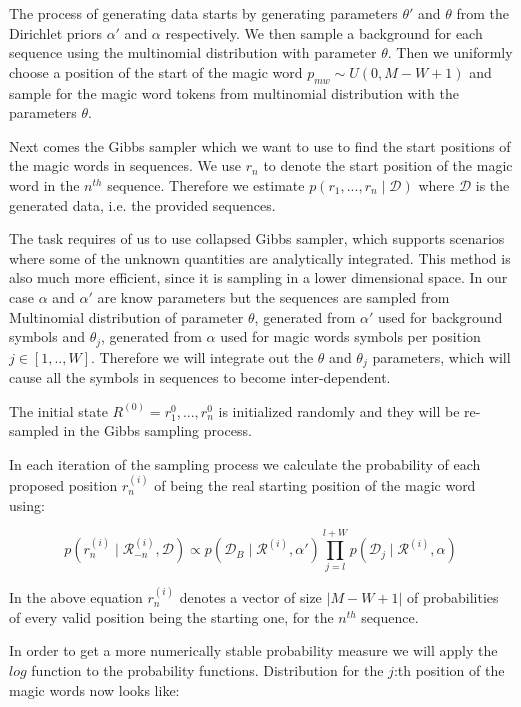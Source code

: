 \documentclass[]{article}
\begin{document}
The process of generating data starts by generating parameters $\theta'$ and $\theta$ from the Dirichlet priors $\alpha'$ and $\alpha$ respectively. We then sample a background for each sequence using the multinomial distribution with parameter $\theta$. Then we uniformly choose a position of the start of the magic word $p_{mw} \sim U(0, M-W+1)$ and sample for the magic word tokens from multinomial distribution with the parameters $\theta$. 

Next comes the Gibbs sampler which we want to use to find the start positions of the magic words in sequences. We use $r_n$ to denote the start position of the magic word in the $n^{th}$ sequence. Therefore we estimate $p(r_1,...,r_n \mid \mathcal{D})$ where $\mathcal{D}$ is the generated data, i.e. the provided sequences.

The task requires of us to use collapsed Gibbs sampler, which supports scenarios where some of the unknown quantities are analytically integrated. This method is also much more efficient, since it is sampling in a lower dimensional space. In our case $\alpha$ and $\alpha'$ are know parameters but the sequences are sampled from Multinomial distribution of parameter $\theta$, generated from $\alpha'$ used for background symbols and $\theta_j$, generated from $\alpha$ used for magic words symbols per position $j \in [1,..,W]$. Therefore we will integrate out the $\theta$ and $\theta_j$ parameters, which will cause all the symbols in sequences to become inter-dependent.

The initial state $R^{(0)} = r_1^0, ..., r_n^0$ is initialized randomly  and they will be re-sampled in the Gibbs sampling process. 

In each iteration of the sampling process we calculate the probability of each proposed position $r_n^{(i)}$ of being the real starting position of the magic word using:

$$ p(r_n^{(i)} \mid \mathcal{R}_{-n}^{(i)}, \mathcal{D}) \propto p(\mathcal{D}_{B} \mid \mathcal{R}^{(i)}, \alpha') \prod_{j=l}^{l+W} p(\mathcal{D}_j \mid \mathcal{R}^{(i)}, \alpha)$$ 

In the above equation $r_n^{(i)}$ denotes a vector of size $| M-W+1 |$ of probabilities of every valid position being the starting one, for the $n^{th}$ sequence. 


In order to get a more numerically stable probability measure we will apply the $log$ function to the probability functions. Distribution for the $j$:th position of the magic words now looks like:
\end{document}
